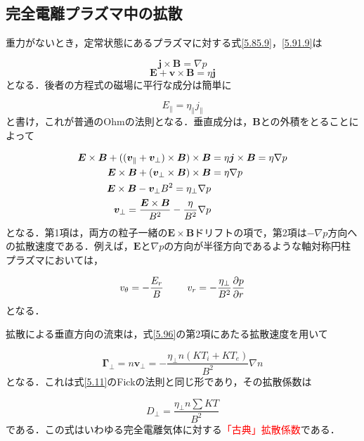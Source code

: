 \documentclass{ltjsarticle}
\numberwithin{equation}{section} %
\begin{document}
\subsection{完全電離プラズマ中の拡散} \label{section5.8}
重力がないとき，定常状態にあるプラズマに対する式\eqref{5.85.9}，\eqref{5.91.9}は

\begin{equation}
  \bm{j} \times \bm{B} = \nabla p \label{5.94}
\end{equation}
\begin{equation}
  \bm{E} + \bm{v}\times \bm{B} = \eta \bm{j} \label{5.95}
\end{equation}
となる．後者の方程式の磁場に平行な成分は簡単に

\[
  E_\parallel = \eta_\parallel j_\parallel 
\]
と書け，これが普通のOhmの法則となる．垂直成分は，$\bm{B}$との外積をとることによって

\begin{align}
  \bm{E} \times \bm{B} + ((\bm{v}_\parallel + \bm{v}_\perp)\times \bm{B})\times \bm{B} &= \eta\bm{j}\times \bm{B}= \eta\nabla p \notag\\
  \bm{E} \times \bm{B} + (\bm{v}_\perp\times \bm{B})\times \bm{B} &= \eta\nabla p \notag\\
  \bm{E}\times \bm{B} - \bm{v}_\perp B^2 = \eta_\perp \nabla p \notag\\
  \bm{v}_\perp = \frac{\bm{E}\times \bm{B}}{B^2} - \frac{\eta}{B^2}\nabla p \label{5.96} 
\end{align}
となる．第1項は，両方の粒子一緒の$\bm{E}\times \bm{B}$ドリフトの項で，第2項は$-\nabla p$方向への拡散速度である．例えば，$\bm{E}$と$\nabla p$の方向が半径方向であるような軸対称円柱プラズマにおいては，

\begin{equation}
  v_\theta = -\frac{E_r}{B}\hspace{2pc}v_r = - \frac{\eta_\perp}{B^2}\frac{\partial p}{\partial r} \label{5.97}
\end{equation}
となる．

拡散による垂直方向の流束は，式\eqref{5.96}の第2項にあたる拡散速度を用いて

\begin{equation}
  \bm{\Gamma}_\perp = n\bm{v}_\perp = -\frac{\eta_\perp n(KT_i + KT_e)}{B^2}\nabla n \label{5.98}
\end{equation}
となる．これは式\eqref{5.11}のFickの法則と同じ形であり，その拡散係数は

\begin{equation}
  \boxed{D_\perp = \frac{\eta_\perp n \sum KT}{B^2}} \label{5.99}
\end{equation}
である．この式はいわゆる完全電離気体に対する\textcolor{red}{「古典」拡散係数}である．
\end{document}
